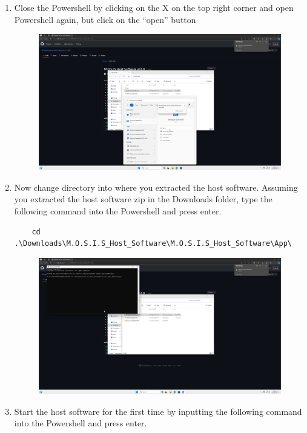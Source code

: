 \documentclass[12pt]{article}
\begin{document}
\begin{center}
\begin{enumerate}
\begin{figure}[H]
		      \end{figure}
		\item Close the Powershell by clicking on the X on the top right corner and open Powershell again, but click on the ``open'' button
		      \begin{figure}[H]
			      \includegraphics[width=\textwidth]{Figures/Windows-Open-Powershell.png}
		      \end{figure}
		\item Now change directory into where you extracted the host software. Assuming you extracted the host software zip in the Downloads folder, type the following command into the Powershell and press enter.
		      \small\begin{verbatim}
    cd .\Downloads\M.O.S.I.S_Host_Software\M.O.S.I.S_Host_Software\App\
  \end{verbatim}
		      \normalsize
		      \begin{figure}[H]
			      \includegraphics[width=\textwidth]{Figures/Windows-cd-Into-Host-Software.png}
		      \end{figure}
		\item Start the host software for the first time by inputting the following command into the Powershell and press enter.

\end{enumerate}
\end{center}
\end{document}
